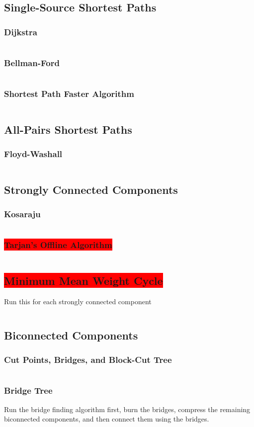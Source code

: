 \documentclass[8pt,a4paper,landscape,oneside]{amsart}
\newcommand{\code}[1]{\inputminted[fontsize=\normalsize,baselinestretch=1]{cpp}{_code/#1}}
\newcommand{\subsectionRed}[1]{\subsection{\colorbox{red}{\color{white}#1}}}
\newcommand{\subsubsectionRed}[1]{\subsubsection{\colorbox{red}{\color{white}#1}}}
\begin{document}
\begin{multicols*}{3}
	\subsection{Single-Source Shortest Paths}
		\subsubsection{Dijkstra}
			\code{graphs/shortest_paths/dijkstra.cpp}
		\subsubsection{Bellman-Ford}
			\code{graphs/shortest_paths/bellman_ford.cpp}
    \subsubsection{Shortest Path Faster Algorithm}
      \code{graphs/shortest_paths/spfa.cpp}
	\subsection{All-Pairs Shortest Paths}
		\subsubsection{Floyd-Washall}
			\code{graphs/shortest_paths/floyd_warshall.cpp}
	\subsection{Strongly Connected Components}
		\subsubsection{Kosaraju}
      \code{graphs/scc/kosaraju.cpp}
    \subsubsectionRed{Tarjan's Offline Algorithm}
      \code{graphs/scc/tarjan.cpp}
  \subsectionRed{Minimum Mean Weight Cycle}
    Run this for each strongly connected component
    \code{graphs/min_mean_cycle.cpp}
	\subsection{Biconnected Components}
	  \subsubsection{Cut Points, Bridges, and Block-Cut Tree}
      \code{graphs/bridges_artics.cpp}
		\subsubsection{Bridge Tree}
      Run the bridge finding algorithm first, burn the bridges, compress the
      remaining biconnected components, and then connect them using the bridges.

\end{multicols*}
\end{document}
